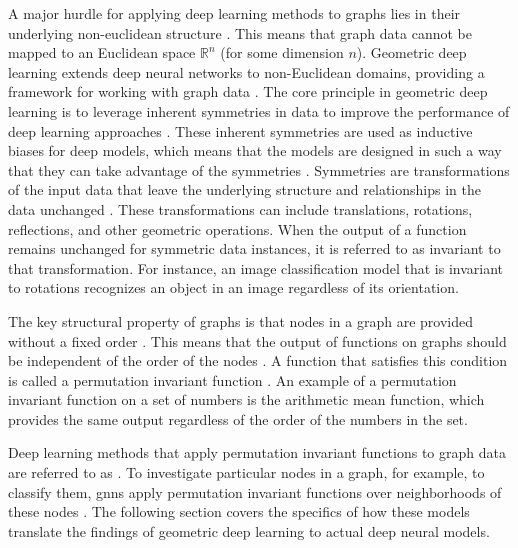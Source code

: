 A major hurdle for applying deep learning methods to graphs lies in their underlying non-euclidean structure \cite{wu_comprehensive_2021}. This means that graph data cannot be mapped to an Euclidean space $\mathbb{R}^n$ (for some dimension $n$). Geometric deep learning extends deep neural networks to non-Euclidean domains, providing a framework for working with graph data \cite{bronstein_geometric_2017, bronstein_geometric_2021}. The core principle in geometric deep learning is to leverage inherent symmetries in data to improve the performance of deep learning approaches \cite{bronstein_geometric_2021}. These inherent symmetries are used as inductive biases for deep models, which means that the models are designed in such a way that they can take advantage of the symmetries \cite{bronstein_geometric_2021}. Symmetries are transformations of the input data that leave the underlying structure and relationships in the data unchanged \cite{bronstein_geometric_2021}. These transformations can include translations, rotations, reflections, and other geometric operations. When the output of a function remains unchanged for symmetric data instances, it is referred to as invariant to that transformation. For instance, an image classification model that is invariant to rotations recognizes an object in an image regardless of its orientation. 



The key structural property of graphs is that nodes in a graph are provided without a fixed order \cite{bronstein_geometric_2021}. This means that the output of functions on graphs should be independent of the order of the nodes \cite{bronstein_geometric_2021}. A function that satisfies this condition is called a permutation invariant function \cite{bronstein_geometric_2021}. An example of a permutation invariant function on a set of numbers is the arithmetic mean function, which provides the same output regardless of the order of the numbers in the set.

Deep learning methods that apply permutation invariant functions to graph data are referred to as . To investigate particular nodes in a graph, for example, to classify them, \glspl{gnn} apply permutation invariant functions over neighborhoods of these nodes \cite{bronstein_geometric_2021}. The following section covers the specifics of how these models translate the findings of geometric deep learning to actual deep neural models.





